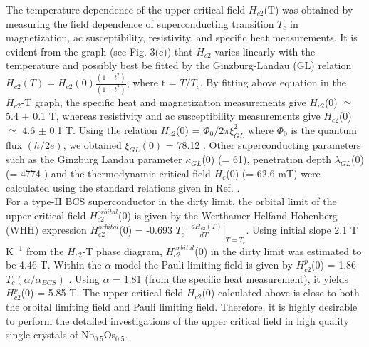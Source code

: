 \documentclass[reprint, superscriptaddress, secnumarabic, amssymb, nobibnotes, aps, prl]{revtex4-1}
\begin{document}
The temperature dependence of the upper critical field $H_{c2}$(T) was obtained by measuring the field dependence of superconducting transition $T_{c}$ in magnetization, ac susceptibility, resistivity, and specific heat measurements. It is evident from the graph (see Fig. 3(c)) that $H_{c2}$ varies linearly with the temperature and possibly best be fitted by the Ginzburg-Landau (GL) relation $H_{c2}(T) = H_{c2}(0)\frac{(1-t^{2})}{(1+t^2)}$, where t = $T/T_{c}$. By fitting above equation in the $H_{c2}$-T graph, the specific heat and magnetization measurements give $H_{c2}$(0) $\simeq$ 5.4 $\pm$ 0.1 T, whereas resistivity and ac susceptibility measurements give $H_{c2}$(0) $\simeq$ 4.6 $\pm$ 0.1 T. Using the relation $H_{c2}$(0) = $\Phi_{0}/2\pi\xi_{GL}^{2}$ where $\Phi_{0}$ is the quantum flux $(h/2e)$, we obtained $\xi_{GL}(0)$ = 78.12 \text{\AA}. Other superconducting parameters such as the Ginzburg Landau parameter $\kappa_{GL}$(0) (= 61), penetration depth $\lambda_{GL}$(0) (= 4774 \text{\AA}) and the thermodynamic critical field $H_{c}$(0) (= 62.6 mT) were calculated using the standard relations given in Ref. \cite{tin}.\\
For a type-II BCS superconductor in the dirty limit, the orbital limit of the upper critical field $H_{c2}^{orbital}$(0) is given by the Werthamer-Helfand-Hohenberg (WHH) \cite{EH,NRW} expression $H_{c2}^{orbital}$(0) = -0.693 $T_{c}\left.\frac{-dH_{c2}(T)}{dT}\right|_{T=T_{c}}$.
Using initial slope 2.1 T K$^{-1}$ from the $H_{c2}$-T phase diagram, $H_{c2}^{orbital}$(0) in the dirty limit was estimated to be 4.46 T. Within the $\alpha$-model the Pauli limiting field is given by $H_{c2}^{p}$(0) = 1.86$T_{c}(\alpha/\alpha_{BCS})$ \cite{DC}. Using $\alpha$ = 1.81 (from the specific heat measurement), it yields $H_{c2}^{p}$(0) = 5.85 T. The upper critical field $H_{c2}$(0) calculated above is close to both the orbital limiting field and Pauli limiting field. Therefore, it is highly desirable to perform the detailed investigations of the upper critical field in high quality single crystals of Nb$_{0.5}$Os$_{0.5}$.\\ 
\end{document}
